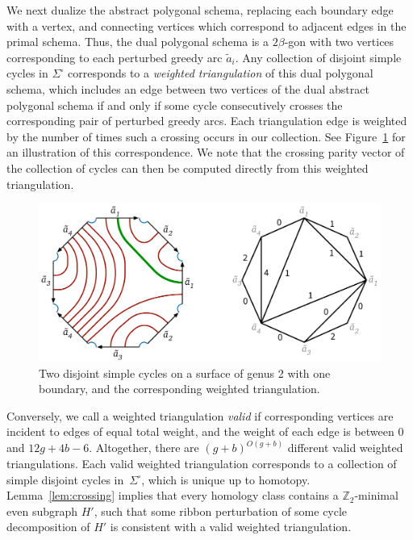 \documentclass[letterpaper,review]{siamart190516}
\def\Z{\mathbb{Z}}
\begin{document}
We next dualize the abstract polygonal schema, replacing each boundary edge with a vertex, and connecting vertices which correspond to adjacent edges in the primal schema.  Thus, the dual polygonal schema is a $2\beta$-gon with two vertices corresponding to each perturbed greedy arc $\tilde{a}_i$.  Any collection of disjoint simple cycles in $\Sigma^\square$ corresponds to a \emph{weighted triangulation} \cite{ccelw-scsih-08} of this dual polygonal schema, which includes an edge between two vertices of the dual abstract polygonal schema if and only if some cycle consecutively crosses the corresponding pair of perturbed greedy arcs.  Each triangulation edge is weighted by the number of times such a crossing occurs in our collection.    See Figure~\ref{fig:weightedtriangulation} for an illustration of this correspondence.  We note that the crossing parity vector of the collection of cycles can then be computed directly from this weighted triangulation.

\begin{figure}[htb]
\centering\includegraphics[scale=0.4]{Fig/schema-triangulation}
\caption{Two disjoint simple cycles on a surface of genus 2 with one boundary, and the corresponding weighted triangulation.}
\label{fig:weightedtriangulation}
\end{figure}

Conversely, we call a weighted triangulation \emph{valid} if corresponding vertices are incident to edges of equal total weight, and the weight of each edge is between $0$ and $12g+4b-6$.  Altogether, there are $(g+b)^{O(g+b)}$ different valid weighted triangulations.  Each valid weighted triangulation corresponds to a collection of simple disjoint cycles in~$\Sigma^\square$, which is unique up to homotopy. Lemma~\ref{lem:crossing} implies that every homology class contains a $\Z_2$-minimal even subgraph $H'$, such that some ribbon perturbation of some cycle decomposition of $H'$ is consistent with a valid weighted triangulation.
\end{document}

